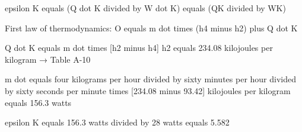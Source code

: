 epsilon K equals (Q dot K divided by W dot K) equals (QK divided by WK)  

First law of thermodynamics: O equals m dot times (h4 minus h2) plus Q dot K  

Q dot K equals m dot times [h2 minus h4]  
h2 equals 234.08 kilojoules per kilogram → Table A-10  

m dot equals four kilograms per hour divided by sixty minutes per hour divided by sixty seconds per minute times [234.08 minus 93.42] kilojoules per kilogram equals 156.3 watts  

epsilon K equals 156.3 watts divided by 28 watts equals 5.582